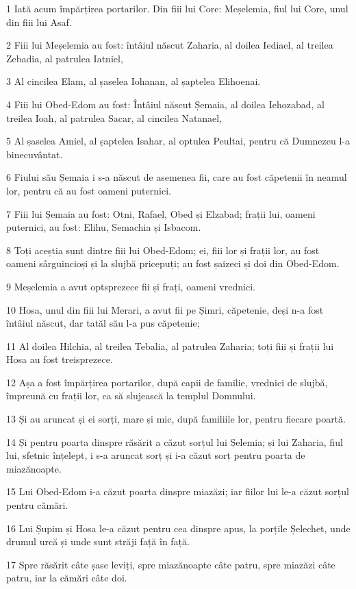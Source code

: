 \par 1 Iată acum împărțirea portarilor. Din fiii lui Core: Meșelemia, fiul lui Core, unul din fiii lui Asaf.
\par 2 Fiii lui Meșelemia au fost: întâiul născut Zaharia, al doilea Iediael, al treilea Zebadia, al patrulea Iatniel,
\par 3 Al cincilea Elam, al șaselea Iohanan, al șaptelea Elihoenai.
\par 4 Fiii lui Obed-Edom au fost: Întâiul născut Șemaia, al doilea Iehozabad, al treilea Ioah, al patrulea Sacar, al cincilea Natanael,
\par 5 Al șaselea Amiel, al șaptelea Isahar, al optulea Peultai, pentru că Dumnezeu l-a binecuvântat.
\par 6 Fiului său Șemaia i s-a născut de asemenea fii, care au fost căpetenii în neamul lor, pentru că au fost oameni puternici.
\par 7 Fiii lui Șemaia au fost: Otni, Rafael, Obed și Elzabad; frații lui, oameni puternici, au fost: Elihu, Semachia și Isbacom.
\par 8 Toți aceștia sunt dintre fiii lui Obed-Edom; ei, fiii lor și frații lor, au fost oameni sârguincioși și la slujbă pricepuți; au fost șaizeci și doi din Obed-Edom.
\par 9 Meșelemia a avut optsprezece fii și frați, oameni vrednici.
\par 10 Hosa, unul din fiii lui Merari, a avut fii pe Șimri, căpetenie, deși n-a fost întâiul născut, dar tatăl său l-a pus căpetenie;
\par 11 Al doilea Hilchia, al treilea Tebalia, al patrulea Zaharia; toți fiii și frații lui Hosa au fost treisprezece.
\par 12 Așa a fost împărțirea portarilor, după capii de familie, vrednici de slujbă, împreună cu frații lor, ca să slujească la templul Domnului.
\par 13 Și au aruncat și ei sorți, mare și mic, după familiile lor, pentru fiecare poartă.
\par 14 Și pentru poarta dinspre răsărit a căzut sorțul lui Șelemia; și lui Zaharia, fiul lui, sfetnic înțelept, i s-a aruncat sorț și i-a căzut sorț pentru poarta de miazănoapte.
\par 15 Lui Obed-Edom i-a căzut poarta dinspre miazăzi; iar fiilor lui le-a căzut sorțul pentru cămări.
\par 16 Lui Șupim și Hosa le-a căzut pentru cea dinspre apus, la porțile Șelechet, unde drumul urcă și unde sunt străji față în față.
\par 17 Spre răsărit câte șase leviți, spre miazănoapte câte patru, spre miazăzi câte patru, iar la cămări câte doi.
